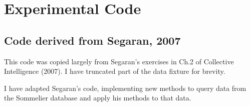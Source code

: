 \section{Experimental Code}

\subsection{Code derived from Segaran, 2007} \label{app:recommendations}

This code was copied largely from Segaran's exercises in Ch.2 of Collective Intelligence (2007). I have truncated part of the data fixture for brevity.

I have adapted Segaran's code, implementing new methods to query data from the Sommelier database and apply his methods to that data.

